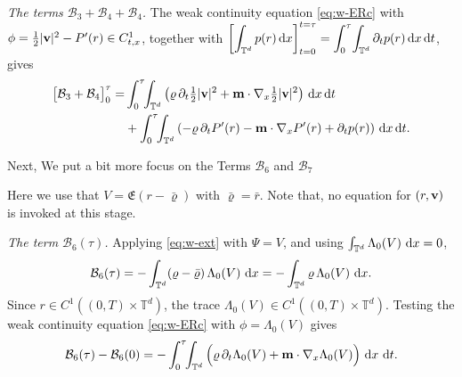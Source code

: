 \documentclass[12pt,a4paper,twoside]{article}
\newcommand{\vr}{\varrho}
\newcommand{\vv}{\vc{v}}
\newcommand{\vc}[1]{{\bf #1}}
\newcommand{\dx}{{\,\rm d} {x}}
\newcommand{\dt}{{\,\rm d} t }
\newcommand{\lr}[1]{\left( #1 \right)}
\numberwithin{equation}{section}%
\newcommand{\T}{\mathbb{T}}
\newcommand{\vm}{\vc{m}}
\newcommand{\Gradx}{\nabla_x}
\newcommand{\Lambdaz}{\Lambda_0}
\begin{document}
\begin{pf}
		\noindent\emph{The terms $\mathcal B_3+\mathcal B_4+\mathcal B_4$.} The weak continuity equation \eqref{eq:w-ERc} with $\phi=\tfrac12|\vv|^2-P'(r)\in C^1_{t,x}$, together with $\displaystyle \left[\int_{\T^d} p(r) \dx  \right]_{t=0}^{t=\tau}=\int_0^\tau\!\int_{\T^d}\partial_t p(r) \dx \dt$, gives
		\begin{equation}\label{B34}
			\begin{aligned}
			\big[\mathcal B_3+\mathcal B_4\big]_0^\tau
			=&\int_0^\tau\!\!\int_{\mathbb T^d}\lr{\vr\,\partial_t\tfrac12|\vv|^2+\vm\cdot\Gradx\tfrac12|\vv|^2}\dx\dt \\
			&+\int_0^\tau\!\!\int_{\mathbb T^d}\lr{-\vr\,\partial_tP'(r)-\vm\cdot\Gradx P'(r)+\partial_tp(r)}\dx\dt .
		\end{aligned}
		\end{equation}
		
	
		Next, We put a bit more focus on the Terms $\mathcal{B}_6$ and $\mathcal{B}_7$

		
		Here we use that $V=\mathfrak{E}(r-\bar\vr)$ with $\bar\vr=\bar r$. Note that, no equation for $(r,\vv)$ is invoked at this stage. 
		

\emph{The term $\mathcal B_6(\tau)$.} Applying \eqref{eq:w-ext} with $\Psi=V$, and using
$\int_{\mathbb T^d}\Lambdaz(V)\,\dx=0$,
\begin{equation*}
	\mathcal B_6(\tau) = -\int_{\mathbb T^d}(\vr-\bar\vr)\,\Lambdaz(V)\,\dx
	= -\int_{\mathbb T^d}\vr\,\Lambdaz(V)\,\dx .
\end{equation*}
Since $r\in C^1((0,T)\times\mathbb T^d)$, the trace $\Lambdaz(V)\in C^1((0,T)\times\mathbb T^d)$.
Testing the weak continuity equation \eqref{eq:w-ERc} with $\phi=\Lambdaz(V)$ gives
\begin{equation}\label{B6-dt}
	\mathcal B_6(\tau)-\mathcal B_6(0)
	= -\int_0^\tau\!\!\int_{\mathbb T^d}\Big(\vr\,\partial_t\Lambdaz(V)
	+ \vm\cdot\Gradx\Lambdaz(V)\Big)\,\dx\,\dt .
\end{equation}


\end{pf}
\end{document}
